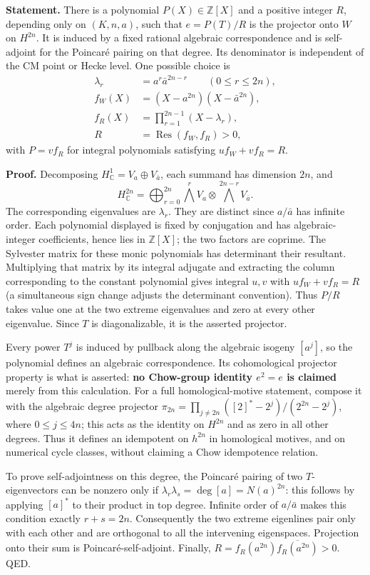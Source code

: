 \documentclass[11pt,a4paper]{article}
\theoremstyle{definition}
\begin{document}
\textbf{Statement.} There is a polynomial \(P(X)\in\mathbb Z[X]\) and a positive integer \(R\), depending only on \((K,n,a)\), such that \(e=P(T)/R\) is the projector onto \(W\) on \(H^{2n}\). It is induced by a fixed rational algebraic correspondence and is self-adjoint for the Poincaré pairing on that degree. Its denominator is independent of the CM point or Hecke level. One possible choice is \[
 \begin{aligned}
 \lambda_r&=a^r\bar a^{2n-r}\qquad(0\leq r\leq2n),\\
 f_W(X)&=(X-a^{2n})(X-\bar a^{2n}),\\
 f_R(X)&=\prod_{r=1}^{2n-1}(X-\lambda_r),\\
 R&=\operatorname{Res}(f_W,f_R)>0,
 \end{aligned}
\] with \(P=vf_R\) for integral polynomials satisfying \(u f_W+v f_R=R\).

\textbf{Proof.} Decomposing \(H^1_\mathbb C=V_a\oplus V_{\bar a}\), each summand has dimension \(2n\), and \[
 H^{2n}_\mathbb C=\bigoplus_{r=0}^{2n}\bigwedge^rV_a\otimes\bigwedge^{2n-r}V_{\bar a}.
\] The corresponding eigenvalues are \(\lambda_r\). They are distinct since \(a/\bar a\) has infinite order. Each polynomial displayed is fixed by conjugation and has algebraic-integer coefficients, hence lies in \(\mathbb Z[X]\); the two factors are coprime. The Sylvester matrix for these monic polynomials has determinant their resultant. Multiplying that matrix by its integral adjugate and extracting the column corresponding to the constant polynomial gives integral \(u,v\) with \(u f_W+v f_R=R\) (a simultaneous sign change adjusts the determinant convention). Thus \(P/R\) takes value one at the two extreme eigenvalues and zero at every other eigenvalue. Since \(T\) is diagonalizable, it is the asserted projector.

Every power \(T^j\) is induced by pullback along the algebraic isogeny \([a^j]\), so the polynomial defines an algebraic correspondence. Its cohomological projector property is what is asserted: \textbf{no Chow-group identity \(e^2=e\) is claimed} merely from this calculation. For a full homological-motive statement, compose it with the algebraic degree projector \(\pi_{2n}=\prod_{j\ne2n}([2]^*-2^j)/(2^{2n}-2^j)\), where \(0\leq j\leq4n\); this acts as the identity on \(H^{2n}\) and as zero in all other degrees. Thus it defines an idempotent on \(h^{2n}\) in homological motives, and on numerical cycle classes, without claiming a Chow idempotence relation.

To prove self-adjointness on this degree, the Poincaré pairing of two \(T\)-eigenvectors can be nonzero only if \(\lambda_r\lambda_s=\deg[a]=N(a)^{2n}\): this follows by applying \([a]^*\) to their product in top degree. Infinite order of \(a/\bar a\) makes this condition exactly \(r+s=2n\). Consequently the two extreme eigenlines pair only with each other and are orthogonal to all the intervening eigenspaces. Projection onto their sum is Poincaré-self-adjoint. Finally, \(R=f_R(a^{2n})\overline{f_R(a^{2n})}>0\). QED.
\end{document}
